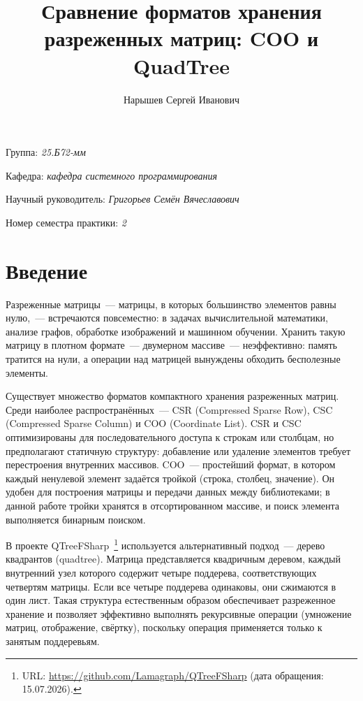 \documentclass[a4paper]{article}
\title{Сравнение форматов хранения разреженных матриц: COO и QuadTree}
\author{Нарышев Сергей Иванович}
\date{}
\begin{document}
\maketitle

\begin{flushright}
    Группа: \emph{25.Б72-мм}

    Кафедра: \emph{кафедра системного программирования}

    Научный руководитель: \emph{Григорьев Семён Вячеславович}

    Номер семестра практики: \emph{2}
\end{flushright}

\section{Введение}

Разреженные матрицы~--- матрицы, в которых большинство элементов равны нулю,~--- встречаются повсеместно: в задачах вычислительной математики, анализе графов, обработке изображений и машинном обучении. Хранить такую матрицу в плотном формате~--- двумерном массиве~--- неэффективно: память тратится на нули, а операции над матрицей вынуждены обходить бесполезные элементы.

Существует множество форматов компактного хранения разреженных матриц. Среди наиболее распространённых~--- CSR (Compressed Sparse Row), CSC (Compressed Sparse Column) и COO (Coordinate List). CSR и CSC оптимизированы для последовательного доступа к строкам или столбцам, но предполагают статичную структуру: добавление или удаление элементов требует перестроения внутренних массивов. COO~--- простейший формат, в котором каждый ненулевой элемент задаётся тройкой (строка, столбец, значение). Он удобен для построения матрицы и передачи данных между библиотеками; в данной работе тройки хранятся в отсортированном массиве, и поиск элемента выполняется бинарным поиском.

В проекте QTreeFSharp~\footnote{URL: \url{https://github.com/Lamagraph/QTreeFSharp} (дата обращения: 15.07.2026).} используется альтернативный подход~--- дерево квадрантов (quadtree). Матрица представляется квадричным деревом, каждый внутренний узел которого содержит четыре поддерева, соответствующих четвертям матрицы. Если все четыре поддерева одинаковы, они сжимаются в один лист. Такая структура естественным образом обеспечивает разреженное хранение и позволяет эффективно выполнять рекурсивные операции (умножение матриц, отображение, свёртку), поскольку операция применяется только к занятым поддеревьям.
\end{document}
